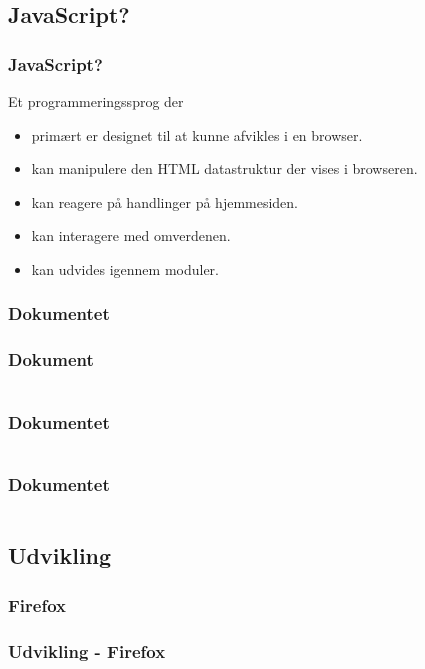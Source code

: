 \subsection{JavaScript?}
\begin{frame}
    \frametitle{JavaScript?}
    Et programmeringssprog der
    \begin{itemize}
      \item primært er designet til at kunne afvikles i en browser.
      \item kan manipulere den HTML datastruktur der vises i browseren.
      \item kan reagere på handlinger på hjemmesiden.
      \item kan interagere med omverdenen.
      \item kan udvides igennem moduler.
    \end{itemize}
\end{frame}

\subsubsection{Dokumentet}

\begin{frame}
    \frametitle{Dokument}
    \inputminted{html}{../src/frontend/part2_hello/index.html}
\end{frame}

\begin{frame}
    \frametitle{Dokumentet}
    \inputminted[highlightlines={11}]{html}{../src/frontend/part2_hello/index.html}
\end{frame}

\begin{frame}
    \frametitle{Dokumentet}
    \inputminted[highlightlines={9}]{html}{../src/frontend/part2_hello/index.html}
\end{frame}

\subsection{Udvikling}

\subsubsection{Firefox}
\begin{frame}
    \frametitle{Udvikling - Firefox}
    \begin{center}
    \end{center}
\end{frame}

